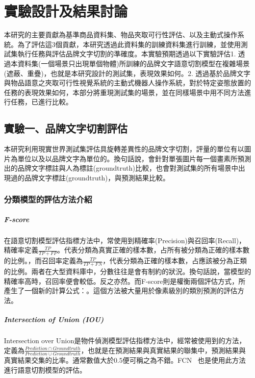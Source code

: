 \chapter{實驗設計及結果討論}
\label{chapter:experiment}

本研究的主要貢獻為基準商品資料集、物品夾取可行性評估、以及主動式操作系統。為了評估這3個貢獻，本研究透過此資料集的訓練資料集進行訓練，並使用測試集執行任務與評估品牌文字切割的準確度。本實驗預期透過以下實驗評估1. 透過本資料集(一個場景只出現單個物體)所訓練的品牌文字語意切割模型在複雜場景(遮蔽、重疊)，也就是本研究設計的測試集，表現效果如何。2. 透過基於品牌文字與物品語意之夾取可行性視覺系統的主動式機器人操作系統，對於特定姿態放置的任務的表現效果如何，本部分將重現測試集的場景，並在同樣場景中用不同方法進行任務，已進行比較。

\section{實驗一、品牌文字切割評估}
本研究利用現實世界測試集評估具旋轉差異性的品牌文字切割，評量的單位有以圖片為單位以及以品牌文字為單位的。換句話說，會針對單張圖片每一個畫素所預測出的品牌文字標註與人為標註(groundtruth)比較，也會對測試集的所有場景中出現過的品牌文字標註(groundtruth)，與預測結果比較。

\subsection{分類模型的評估方法介紹}

\paragraph{F-score}
在語意切割模型評估指標方法中，常使用到精確率(Precision)與召回率(Recall)，精確率定義$\frac{TP}{TP + FP}$。代表分類為真實正確的樣本數，占所有被分類為正確的樣本數的比例。，而召回率定義為$\frac{TP}{TP + FN}$，代表分類為正確的樣本數，占應該被分為正類的比例。兩者在大型資料庫中，分數往往是會有制約的狀況。換句話說，當模型的精確率高時，召回率便會較低。反之亦然。而F-score則是權衡兩個評估方式，所產生了一個新的計算公式：。這個方法被大量用於像素級別的類別預測的評估方法。

\paragraph{Intersection of Union (IOU)}
Intersection over Union是物件偵測模型評估指標方法中，經常被使用到的方法，定義為$\frac{Prediction \cap  Groundtruth}{Prediction \cup  Groundtruth}$，也就是在預測結果與真實結果的聯集中，預測結果與真實結果交集的比率。通常數值大於0.5便可稱之為不錯。FCN ~\cite{long2015fully}也是使用此方法進行語意切割模型的評估。

